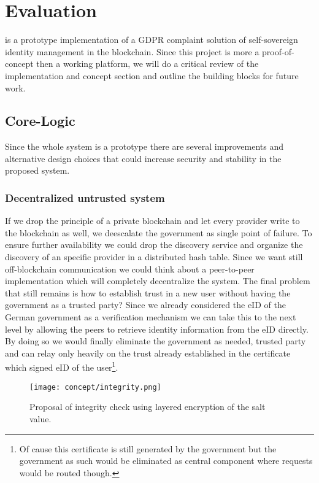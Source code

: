 \chapter{Evaluation}
\label{cha:evaluation}

\projectName{} is a prototype implementation of a GDPR complaint solution of self-sovereign identity management in the blockchain. Since this project is more a proof-of-concept then a working platform, we will do a critical review of the implementation and concept section and outline the building blocks for future work.  

\section{Core-Logic}
\label{sec:coreLogicEval}
Since the whole system is a prototype there are several improvements and alternative design choices that could increase security and stability in the proposed system.

\subsection{Decentralized untrusted system}
\label{sec:untrustedSystem}
If we drop the principle of a private blockchain and let every provider write to the blockchain as well, we deescalate the government as single point of failure. To ensure further availability we could drop the discovery service and organize the discovery of an specific provider in a distributed hash table. Since we want still off-blockchain communication we could think about a peer-to-peer implementation which will completely decentralize the system. The final problem that still remains is how to establish trust in a new user without having the government as a trusted party? Since we already considered the eID of the German government as a verification mechanism we can take this to the next level by allowing the peers to retrieve identity information from the eID directly. By doing so we would finally eliminate the government as needed, trusted party and can relay only heavily on the trust already established in the certificate which signed eID of the user\footnote{Of cause this certificate is still generated by the government but the government as such would be eliminated as central component where requests would be routed though.}.

\begin{figure}
\texttt{[image: concept/integrity.png]}
\centering
\caption{Proposal of integrity check using layered encryption of the salt value.}
\label{fig:integrity}
\end{figure}

